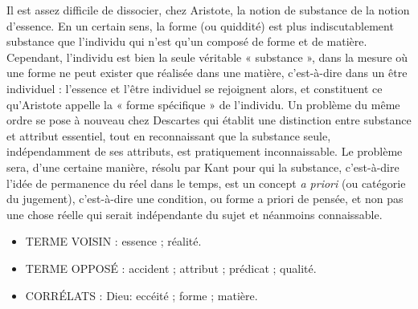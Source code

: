 Il est assez difficile de dissocier, chez
Aristote, la notion de substance de la
notion d'essence. En un certain sens, la
forme (ou quiddité) est plus indiscutablement substance que l'individu qui
n'est qu'un composé de forme et de
matière. Cependant, l'individu est bien
la seule véritable « substance », dans la
mesure où une forme ne peut exister
que réalisée dans une matière, c'est-à-dire dans un être individuel : l'essence
et l'être individuel se rejoignent alors, et
constituent ce qu'Aristote appelle la
« forme spécifique » de l'individu. Un
problème du même ordre se pose à
nouveau chez Descartes qui établit une
distinction entre substance et attribut
essentiel, tout en reconnaissant que la
substance seule, indépendamment de
ses attributs, est pratiquement inconnaissable. Le problème sera, d’une certaine
manière, résolu par Kant pour qui la
substance, c'est-à-dire l’idée de permanence du réel dans le temps, est un
concept {\it a priori} (ou catégorie du jugement), c'est-à-dire une condition, ou
forme a priori de pensée, et non pas
une chose réelle qui serait indépendante du sujet et néanmoins connaissable.

\begin{itemize}[leftmargin=1cm, label=, itemsep=1pt]
\item {\footnotesize TERME VOISIN} : essence ; réalité.
\item {\footnotesize TERME OPPOSÉ} : accident ; attribut ; prédicat ; qualité.
\item {\footnotesize CORRÉLATS} : Dieu: eccéité ; forme ; matière.
\end{itemize}

